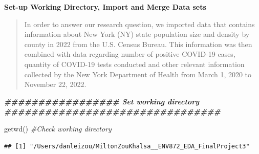 \documentclass[
  12pt,
]{article}
\newenvironment{Shaded}{\begin{snugshade}}{\end{snugshade}}
\newcommand{\CommentTok}[1]{\textcolor[rgb]{0.56,0.35,0.01}{\textit{#1}}}
\newcommand{\DocumentationTok}[1]{\textcolor[rgb]{0.56,0.35,0.01}{\textbf{\textit{#1}}}}
\newcommand{\FunctionTok}[1]{\textcolor[rgb]{0.00,0.00,0.00}{#1}}
\newcommand{\NormalTok}[1]{#1}
\begin{document}
\newpage

\textbf{Set-up Working Directory, Import and Merge Data sets}

\begin{quote}
In order to answer our research question, we imported data that contains
information about New York (NY) state population size and density by
county in 2022 from the U.S. Census Bureau. This information was then
combined with data regarding number of positive COVID-19 cases, quantity
of COVID-19 tests conducted and other relevant information collected by
the New York Department of Health from March 1, 2020 to November 22,
2022.
\end{quote}

\begin{Shaded}
\begin{Highlighting}[]
\DocumentationTok{\#\#\#\#\#\#\#\#\#\#\#\#\#\#\#\#\# Set working directory \#\#\#\#\#\#\#\#\#\#\#\#\#\#\#\#\#\#\#\#\#\#\#\#\#\#\#\#\#\#\#\#}

\FunctionTok{getwd}\NormalTok{() }\CommentTok{\#Check working directory}
\end{Highlighting}
\end{Shaded}

\begin{verbatim}
## [1] "/Users/danleizou/MiltonZouKhalsa__ENV872_EDA_FinalProject3"
\end{verbatim}
\end{document}
